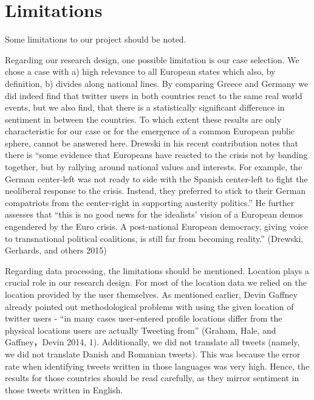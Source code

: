 \documentclass[]{article}
\begin{document}
\newpage

\section{Limitations}\label{limitations}

Some limitations to our project should be noted.

Regarding our research design, one possible limitation is our case
selection. We chose a case with a) high relevance to all European states
which also, by definition, b) divides along national lines. By comparing
Greece and Germany we did indeed find that twitter users in both
countries react to the same real world events, but we also find, that
there is a statistically significant difference in sentiment in between
the countries. To which extent these results are only characteristic for
our case or for the emergence of a common European public sphere, cannot
be answered here. Drewski in his recent contribution notes that there is
``some evidence that Europeans have reacted to the crisis not by banding
together, but by rallying around national values and interests. For
example, the German center‐left was not ready to side with the Spanish
center‐left to fight the neoliberal response to the crisis. Instead,
they preferred to stick to their German compatriots from the
center‐right in supporting austerity politics.'' He further assesses
that ``this is no good news for the idealists' vision of a European
demos engendered by the Euro crisis. A post‐national European democracy,
giving voice to transnational political coalitions, is still far from
becoming reality.'' (Drewski, Gerhards, and others 2015)

Regarding data processing, the limitations should be mentioned. Location
plays a crucial role in our research design. For most of the location
data we relied on the location provided by the user themselves. As
mentioned earlier, Devin Gaffney already pointed out methodological
problems with using the given location of twitter users - ``in many
cases user-entered profile locations differ from the physical locations
users are actually Tweeting from'' (Graham, Hale, and Gaffney，Devin
2014, 1). Additionally, we did not translate all tweets (namely, we did
not translate Danish and Romanian tweets). This was because the error
rate when identifying tweets written in those languages was very high.
Hence, the results for those countries should be read carefully, as they
mirror sentiment in those tweets written in English.
\end{document}

